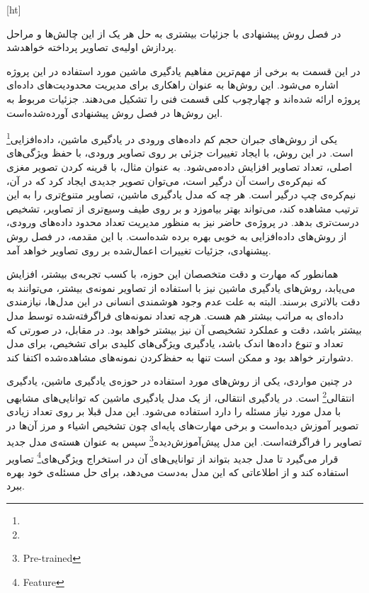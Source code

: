 [ht]


در فصل روش پیشنهادی با جزئیات بیشتری به حل هر یک از این چالش‌ها و مراحل پردازش اولیه‌ی تصاویر پرداخته خواهد‌شد.


در این قسمت به برخی از مهم‌ترین مفاهیم یادگیری ماشین مورد استفاده در این پروژه اشاره می‌شود.
این روش‌ها به عنوان راهکاری برای مدیریت محدودیت‌های داده‌ای پروژه ارائه شده‌اند و چهارچوب کلی قسمت فنی را تشکیل می‌دهند.
جزئیات مربوط به این روش‌ها در فصل روش پیشنهادی آورده‌شده‌است.


یکی از روش‌های جبران حجم کم داده‌های ورودی در یادگیری ماشین، 
داده‌افزایی\footnote{}
 است.
در این روش، با ایجاد تغییرات جزئی بر روی تصاویر ورودی، با حفظ ویژگی‌های اصلی، تعداد تصاویر افزایش داده‌می‌شود.
به عنوان مثال، با قرینه کردن تصویر مغزی که نیم‌کره‌ی راست آن درگیر است، می‌‌توان تصویر جدیدی ایجاد کرد که در آن، نیم‌کره‌ی چپ درگیر است.
هر چه که مدل یادگیری ماشین، تصاویر متنوع‌تری را به این ترتیب مشاهده کند، می‌تواند بهتر بیاموزد و بر روی طیف وسیع‌تری از تصاویر، تشخیص درست‌تری بدهد.
در پروژه‌ی حاضر نیز به منظور مدیریت تعداد محدود داده‌های ورودی، از روش‌های داده‌افزایی به خوبی بهره برده شده‌است.
با این مقدمه، در فصل روش پیشنهادی، جزئیات تغییرات اعمال‌شده بر روی تصاویر خواهد آمد.


همانطور که مهارت و دقت متخصصان این حوزه، با کسب تجربه‌ی بیشتر، افزایش می‌یابد،
روش‌های یادگیری ماشین نیز با استفاده از تصاویر نمونه‌ی بیشتر، می‌توانند به دقت بالاتری برسند.
البته به علت عدم وجود هوشمندی انسانی در این مدل‌ها، نیازمندی داده‌ای به مراتب بیشتر هم هست.
هرچه تعداد نمونه‌های فراگرفته‌شده توسط مدل بیشتر باشد، دقت و عملکرد تشخیصی آن نیز بیشتر خواهد بود.
در مقابل، در صورتی که تعداد و تنوع داده‌ها اندک باشد، یادگیری ویژگی‌های کلیدی برای تشخیص، برای مدل دشوارتر خواهد بود و ممکن است تنها به حفظ‌کردن نمونه‌های مشاهده‌شده اکتفا کند.

در چنین مواردی، یکی از روش‌های مورد استفاده در حوزه‌ی یادگیری ماشین، 
یادگیری انتقالی\footnote{}
 است.
در یادگیری انتقالی، از یک مدل یادگیری ماشین که توانایی‌های مشابهی با مدل مورد نیاز مسئله را دارد
استفاده می‌شود.
این مدل قبلا بر روی تعداد زیادی تصویر آموزش دیده‌است و برخی مهارت‌های پایه‌ای چون تشخیص اشیاء و مرز آن‌ها در تصاویر را فراگرفته‌است.
این مدل 
پیش‌آموزش‌دیده\footnote{Pre-trained}
سپس
به عنوان هسته‌ی مدل جدید قرار می‌گیرد تا مدل جدید بتواند از توانایی‌های آن در استخراج ویژگی‌های\footnote{Feature} تصاویر استفاده کند 
و از اطلاعاتی که این مدل به‌دست می‌دهد، برای حل مسئله‌ی خود بهره ببرد.

